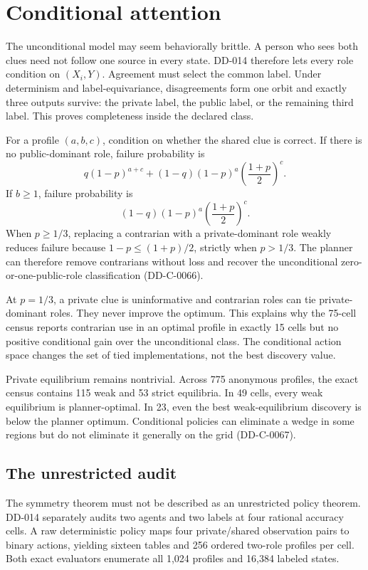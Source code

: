 \documentclass[11pt]{article}
\begin{document}


\section{Conditional attention}

The unconditional model may seem behaviorally brittle. A person who sees both
clues need not follow one source in every state. DD-014 therefore lets every
role condition on $(X_i,Y)$. Agreement must select the common label. Under
determinism and label-equivariance, disagreements form one orbit and exactly
three outputs survive: the private label, the public label, or the remaining
third label. This proves completeness inside the declared class.

For a profile $(a,b,c)$, condition on whether the shared clue is correct. If
there is no public-dominant role, failure probability is
\[
 q(1-p)^{a+c}+(1-q)(1-p)^a\left(\frac{1+p}{2}\right)^c.
\]
If $b\geq1$, failure probability is
\[
 (1-q)(1-p)^a\left(\frac{1+p}{2}\right)^c.
\]
When $p\geq1/3$, replacing a contrarian with a private-dominant role weakly
reduces failure because $1-p\leq(1+p)/2$, strictly when $p>1/3$. The planner
can therefore remove contrarians without loss and recover the unconditional
zero-or-one-public-role classification (DD-C-0066).

At $p=1/3$, a private clue is uninformative and contrarian roles can tie private-
dominant roles. They never improve the optimum. This explains why the 75-cell
census reports contrarian use in an optimal profile in exactly 15 cells but no
positive conditional gain over the unconditional class. The conditional action
space changes the set of tied implementations, not the best discovery value.

Private equilibrium remains nontrivial. Across 775 anonymous profiles, the
exact census contains 115 weak and 53 strict equilibria. In 49 cells, every weak
equilibrium is planner-optimal. In 23, even the best weak-equilibrium discovery
is below the planner optimum. Conditional policies can eliminate a wedge in
some regions but do not eliminate it generally on the grid (DD-C-0067).



\subsection{The unrestricted audit}

The symmetry theorem must not be described as an unrestricted policy theorem.
DD-014 separately audits two agents and two labels at four rational accuracy
cells. A raw deterministic policy maps four private/shared observation pairs to
binary actions, yielding sixteen tables and 256 ordered two-role profiles per
cell. Both exact evaluators enumerate all 1,024 profiles and 16,384 labeled
states.
\end{document}
